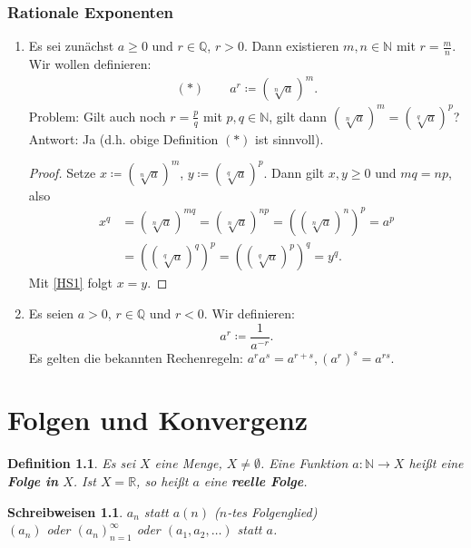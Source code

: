 \documentclass[12pt]{extreport} %
\newcommand{\N}{\mathbb{N}}
\newcommand{\Q}{\mathbb{Q}}
\newcommand{\R}{\mathbb{R}}
\theoremstyle{named}
\theoremstyle{itshape}
\newtheorem*{definition}{Definition}
\theoremstyle{normal}
\newtheorem*{schreibweisen}{Schreibweisen}
\begin{document}
\subsection*{Rationale Exponenten}
\begin{enumerate}
	\item Es sei zunächst $a \ge 0$ und $r \in \Q$, $r > 0$. Dann existieren $m, n \in \N$ mit $r = \frac{m}{n}$. Wir wollen definieren:
		\begin{align*}
		(\ast) \quad \quad a^{r} \coloneqq \left( \sqrt[n]{a} \right)^{m}. 			
		\end{align*}
		Problem: Gilt auch noch $r = \frac{p}{q}$ mit $p, q \in \N$, gilt dann $\left( \sqrt[n]{a} \right)^{m} = \left( \sqrt[q]{a} \right)^{p}$? \\
		Antwort: Ja (d.h. obige Definition $(*)$ ist sinnvoll).
		\begin{proof}
			Setze $x \coloneqq \left( \sqrt[n]{a} \right)^{m}$, $y \coloneqq \left( \sqrt[q]{a} \right)^{p}$. Dann gilt $x, y \geq 0$ und $mq = np$, also
			\begin{align*}
				x^{q} & = \left( \sqrt[n]{a} \right)^{mq} = \left( \sqrt[n]{a} \right)^{np} = \left(  \left( \sqrt[n]{a} \right)^{n}\right)^{p} = a^{p} \\
					  & = \left( \left( \sqrt[q]{a} \right)^{q}\right)^{p} = \left( \left( \sqrt[q]{a} \right)^{p}\right)^{q} = y^{q}.
			\end{align*}
			Mit \ref{HS1} folgt $x = y$.  
		\end{proof}
	\item Es seien $a > 0$, $r \in \Q$ und $r < 0$. Wir definieren: $$a^{r} \coloneqq \frac{1}{a^{-r}}.$$
	          Es gelten die bekannten Rechenregeln: $a^{r} a^{s} = a^{r + s}, \left( a^{r} \right)^{s} = a^{rs}$.
\end{enumerate}


\newpage


\chapter{Folgen und Konvergenz}

\begin{definition}
	Es sei $X$ eine Menge, $X \neq \emptyset$. Eine Funktion $a \colon \N \to X$ hei{\ss}t eine \textbf{Folge in} $X$. Ist $X = \R$, so hei{\ss}t $a$ eine 
	\textbf{reelle Folge}.
\end{definition}


\begin{schreibweisen}
$a_{n}$ statt $a(n)$ ($n$-tes Folgenglied) \\
$(a_{n})$ oder $(a_{n})_{n = 1}^{\infty}$ oder $(a_{1}, a_{2}, \dotsc)$ statt $a$.
\end{schreibweisen}
\end{document}
